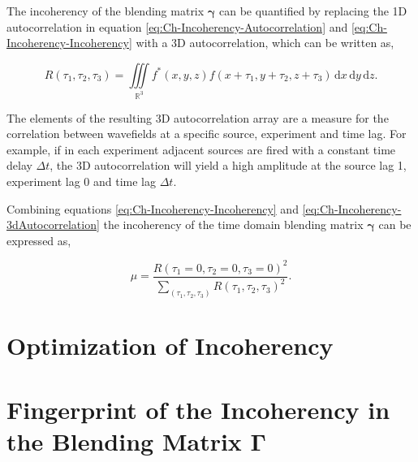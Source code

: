 The incoherency of the blending matrix $\mathbf{\gamma}$ can be quantified by replacing the 1D autocorrelation in equation \ref{eq:Ch-Incoherency-Autocorrelation} and \ref{eq:Ch-Incoherency-Incoherency} with a 3D autocorrelation, which can be written as,

\begin{equation}
	R(\tau_1,\tau_2,\tau_3) = \iiint\limits_{\mathbb{R}^3} f^*(x,y,z) f(x + \tau_1,y + \tau_2, z + \tau_3) \, \text{d} x \, \text{d} y \, \text{d} z.
	\label{eq:Ch-Incoherency-3dAutocorrelation}
\end{equation}


The elements of the resulting 3D autocorrelation array are a measure for the correlation between wavefields at a specific source, experiment and time lag. For example, if in each experiment adjacent sources are fired with a constant time delay $\Delta t$, the 3D autocorrelation will yield a high amplitude at the source lag 1, experiment lag 0 and time lag $\Delta t$.

Combining equations \ref{eq:Ch-Incoherency-Incoherency} and \ref{eq:Ch-Incoherency-3dAutocorrelation} the incoherency of the time domain blending matrix $\mathbf{\gamma}$ can be expressed as,

\begin{equation}
	\mu = \frac{R(\tau_1 = 0,\tau_2 = 0,\tau_3 = 0)^2}{\sum\limits_{(\tau_1,\tau_2,\tau_3)} R(\tau_1,\tau_2,\tau_3)^2}	.
	\label{eq:Ch-Incoherency-Incoherency3d}
\end{equation} 

\section{Optimization of Incoherency}


\section{Fingerprint of the Incoherency in the Blending Matrix $\mathbf{\Gamma}$}

